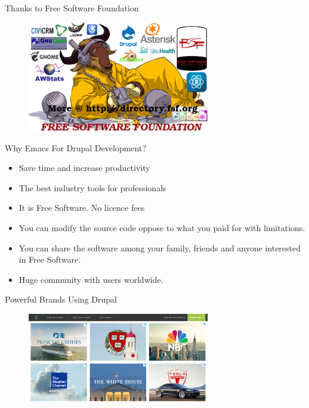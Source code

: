 \documentclass[english,12pt,presentation]{beamer}
\begin{document}
\begin{frame}{Thanks to Free Software Foundation}
\begin{figure}
\centering
\includegraphics[width=300]{images/fsf.png}
\end{figure}
\end{frame}

\begin{frame}{Why Emacs For Drupal Development?}
\begin{itemize}
\pause \item Save time and increase productivity
\pause \item The best industry tools for professionals
\pause \item It is Free Software. No licence fees
\pause \item You can modify the source code oppose to what you paid for with limitations.
\pause \item You can share the software among your family, friends and anyone interested in Free Software.
\pause \item Huge community with users worldwide.
\end{itemize}
\end{frame}

\begin{frame}{Powerful Brands Using Drupal}
\begin{figure}
\centering
\includegraphics[width=300]{images/drupaluser.png}
\end{figure}
\end{frame}
\end{document}
